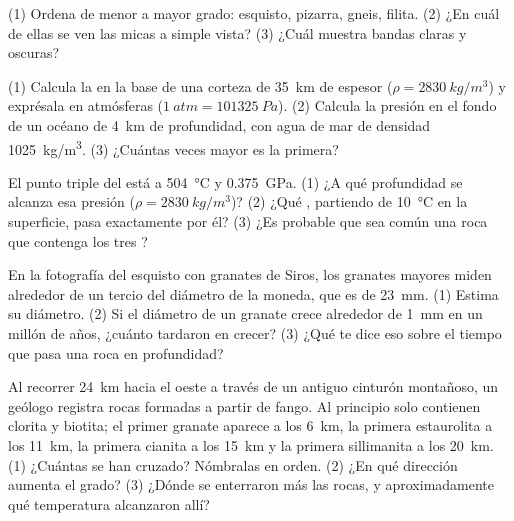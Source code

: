 \begin{exercise}[$\star$]\label{exo:g12:metamorphic-rocks:5}
(1) Ordena de menor a mayor grado: esquisto, pizarra, gneis, filita. (2) ¿En
cuál de ellas se ven las micas a simple vista? (3) ¿Cuál muestra bandas
claras y oscuras?
\end{exercise}

\begin{exercise}[$\star\star$]\label{exo:g12:metamorphic-rocks:6}
(1) Calcula la  en la base de una corteza de \qty{35}{km}
de espesor ($\rho = \qty{2830}{kg/m^3}$) y exprésala en atmósferas
($\qty{1}{atm} = \qty{101325}{Pa}$). (2) Calcula la presión en el fondo
de un océano de \qty{4}{km} de profundidad, con agua de mar de densidad
\qty{1025}{kg/m^3}. (3) ¿Cuántas veces mayor es la primera?
\end{exercise}

\begin{exercise}[$\star\star$]\label{exo:g12:metamorphic-rocks:7}
El punto triple del  está a \qty{504}{\celsius} y
\qty{0.375}{GPa}. (1) ¿A qué profundidad se alcanza esa presión ($\rho =
\qty{2830}{kg/m^3}$)? (2) ¿Qué , partiendo de
\qty{10}{\celsius} en la superficie, pasa exactamente por él? (3) ¿Es probable
que sea común una roca que contenga los tres ?
\end{exercise}

\begin{exercise}[$\star\star$]\label{exo:g12:metamorphic-rocks:8}
En la fotografía del esquisto con granates de Siros, los granates mayores
miden alrededor de un tercio del diámetro de la moneda, que es de
\qty{23}{mm}. (1) Estima su diámetro. (2) Si el diámetro de un granate crece
alrededor de \qty{1}{mm} en un millón de años, ¿cuánto tardaron en crecer?
(3) ¿Qué te dice eso sobre el tiempo que pasa una roca en profundidad?
\end{exercise}

\begin{exercise}[$\star\star$]\label{exo:g12:metamorphic-rocks:9}
Al recorrer \qty{24}{km} hacia el oeste a través de un antiguo cinturón
montañoso, un geólogo registra rocas formadas a partir de fango. Al principio
solo contienen clorita y biotita; el primer granate aparece a los
\qty{6}{km}, la primera estaurolita a los \qty{11}{km}, la primera cianita a
los \qty{15}{km} y la primera sillimanita a los \qty{20}{km}. (1) ¿Cuántas
 se han cruzado? Nómbralas en orden. (2) ¿En qué dirección aumenta
el grado? (3) ¿Dónde se enterraron más las rocas, y aproximadamente qué
temperatura alcanzaron allí?
\end{exercise}

